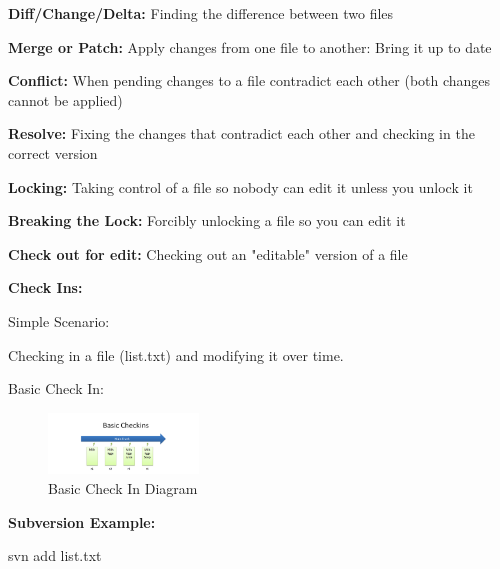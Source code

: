 \documentclass{article}
\begin{document}
\begin{flushedleft}
\textbf{Diff/Change/Delta:} Finding the difference between two files \\
\par

\textbf{Merge or Patch:} Apply changes from one file to another: Bring it up to date \\
\par

\textbf{Conflict:} When pending changes to a file contradict each other (both changes cannot be applied) \\
\par

\textbf{Resolve:} Fixing the changes that contradict each other and checking in the correct version \\
\par

\textbf{Locking:} Taking control of a file so nobody can edit it unless you unlock it \\
\par

\textbf{Breaking the Lock:} Forcibly unlocking a file so you can edit it \\
\par

\textbf{Check out for edit:} Checking out an "editable" version of a file \\
\par

\textbf{Check Ins:} \\
\par

Simple Scenario: \\
\par

Checking in a file (list.txt) and modifying it over time.

Basic Check  In:

\begin{figure}[htp]
\centering
\includegraphics[width=4cm]{BasicCheckIn.png}
\caption{Basic Check In Diagram}
\label{fig:BCIDiagram}
\end{figure} 


\textbf{Subversion Example:} \\
\par

svn add list.txt \par


\end{flushedleft}
\end{document}
